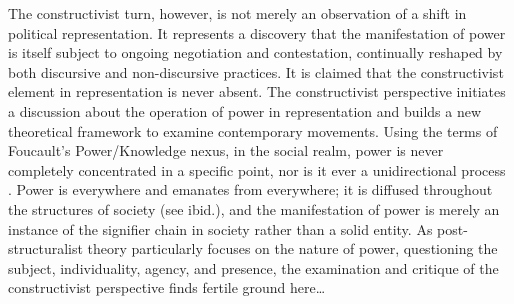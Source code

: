 
The constructivist turn, however, is not merely an observation of a shift in political representation. It represents a discovery that the manifestation of power is itself subject to ongoing negotiation and contestation, continually reshaped by both discursive and non-discursive practices. It is claimed that the constructivist element in representation is never absent. The constructivist perspective initiates a discussion about the operation of power in representation and builds a new theoretical framework to examine contemporary movements. Using the terms of Foucault's Power/Knowledge nexus, in the social realm, power is never completely concentrated in a specific point, nor is it ever a unidirectional process \parencite{Foucault1980}. Power is everywhere and emanates from everywhere; it is diffused throughout the structures of society (see ibid.), and the manifestation of power is merely an instance of the signifier chain in society rather than a solid entity. As post-structuralist theory particularly focuses on the nature of power, questioning the subject, individuality, agency, and presence, the examination and critique of the constructivist perspective finds fertile ground here\dots


